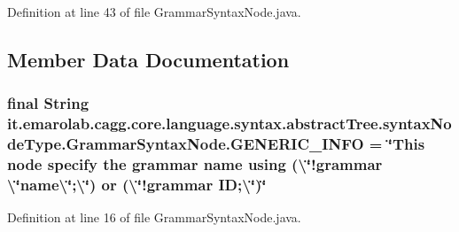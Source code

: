 Definition at line 43 of file Grammar\-Syntax\-Node.\-java.



\subsection{Member Data Documentation}
\hypertarget{classit_1_1emarolab_1_1cagg_1_1core_1_1language_1_1syntax_1_1abstractTree_1_1syntaxNodeType_1_1GrammarSyntaxNode_aea5af6b4909ae2c5c6b7f2d539a94221}{
\subsubsection[{G\-E\-N\-E\-R\-I\-C\-\_\-\-I\-N\-F\-O}]{\setlength{\rightskip}{0pt plus 5cm}final String it.\-emarolab.\-cagg.\-core.\-language.\-syntax.\-abstract\-Tree.\-syntax\-Node\-Type.\-Grammar\-Syntax\-Node.\-G\-E\-N\-E\-R\-I\-C\-\_\-\-I\-N\-F\-O = \char`\"{}This node specify the grammar name using (\textbackslash{}\char`\"{}!grammar \textbackslash{}\char`\"{}name\textbackslash{}\char`\"{};\textbackslash{}\char`\"{}) or (\textbackslash{}\char`\"{}!grammar I\-D;\textbackslash{}\char`\"{})\char`\"{}\hspace{0.3cm}{\ttfamily [static]}}}\label{classit_1_1emarolab_1_1cagg_1_1core_1_1language_1_1syntax_1_1abstractTree_1_1syntaxNodeType_1_1GrammarSyntaxNode_aea5af6b4909ae2c5c6b7f2d539a94221}


Definition at line 16 of file Grammar\-Syntax\-Node.\-java.

